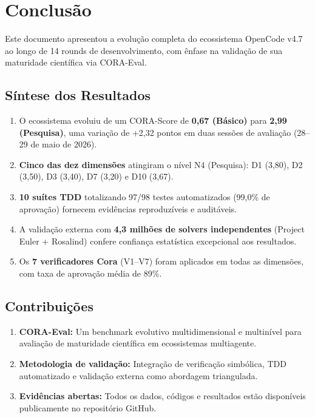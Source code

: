 \documentclass[12pt,a4paper,oneside]{article}
\begin{document}
\section{Conclusão}

Este documento apresentou a evolução completa do ecossistema OpenCode v4.7 ao
longo de 14 rounds de desenvolvimento, com ênfase na validação de sua
maturidade científica via CORA-Eval.

\subsection{Síntese dos Resultados}

\begin{enumerate}[label=(\roman*)]
\item O ecossistema evoluiu de um CORA-Score de \textbf{0,67 (Básico)} para
      \textbf{2,99 (Pesquisa)}, uma variação de +2,32 pontos em duas sessões
      de avaliação (28--29 de maio de 2026).
\item \textbf{Cinco das dez dimensões} atingiram o nível N4 (Pesquisa): D1
      (3,80), D2 (3,50), D3 (3,40), D7 (3,20) e D10 (3,67).
\item \textbf{10 suítes TDD} totalizando 97/98 testes automatizados (99,0\%
      de aprovação) fornecem evidências reproduzíveis e auditáveis.
\item A validação externa com \textbf{4,3 milhões de solvers independentes}
      (Project Euler + Rosalind) confere confiança estatística excepcional
      aos resultados.
\item Os \textbf{7 verificadores Cora} (V1--V7) foram aplicados em todas as
      dimensões, com taxa de aprovação média de 89\%.
\end{enumerate}

\subsection{Contribuições}

\begin{enumerate}[label=(\roman*)]
\item \textbf{CORA-Eval:} Um benchmark evolutivo multidimensional e multinível
      para avaliação de maturidade científica em ecossistemas multiagente.
\item \textbf{Metodologia de validação:} Integração de verificação simbólica,
      TDD automatizado e validação externa como abordagem triangulada.
\item \textbf{Evidências abertas:} Todos os dados, códigos e resultados estão
      disponíveis publicamente no repositório GitHub.
\end{enumerate}
\end{document}
